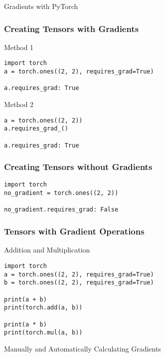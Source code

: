 \documentclass[14 pt]{beamer}
\begin{document}
\begin{frame}
\begin{center}
\Large{Gradients with PyTorch}
\end{center}
\end{frame}

\begin{frame}[fragile]
  \frametitle{Creating Tensors with Gradients}
  \begin{block}{Method 1}
\begin{verbatim}
import torch
a = torch.ones((2, 2), requires_grad=True)

a.requires_grad: True
\end{verbatim}
  \end{block}
  \begin{block}{Method 2}
\begin{verbatim}
a = torch.ones((2, 2))
a.requires_grad_()

a.requires_grad: True
\end{verbatim}
  \end{block}
\end{frame}

\begin{frame}[fragile]
  \frametitle{Creating Tensors without Gradients}
  \begin{block}{}
\begin{verbatim}
import torch
no_gradient = torch.ones((2, 2))

no_gradient.requires_grad: False
\end{verbatim}
  \end{block}
\end{frame}

\begin{frame}[fragile]
  \frametitle{Tensors with Gradient Operations}
  \begin{block}{Addition and Multiplication}
\begin{verbatim}
import torch
a = torch.ones((2, 2), requires_grad=True)
b = torch.ones((2, 2), requires_grad=True)

print(a + b)
print(torch.add(a, b))

print(a * b)
print(torch.mul(a, b))
\end{verbatim}
  \end{block}
\end{frame}

\begin{frame}
  \begin{center}
    \Large{Manually and Automatically Calculating Gradients}
  \end{center}
\end{frame}
\end{document}

